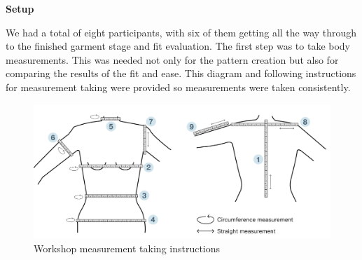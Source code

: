 \noindent \textbf{Setup}

We had a total of eight participants, with six of them getting all the way through to the finished garment stage and fit evaluation.
\newline
The first step was to take body measurements. This was needed not only for the pattern creation but also for comparing the results of the fit and ease. This diagram and following instructions for measurement taking were provided so measurements were taken consistently.
\begin{figure} [H] %
    \centering %
    \includegraphics[width = \textwidth]{Images/Measurement Taking Guide.png} %
    \caption{Workshop measurement taking instructions}
    \label{} %
\end{figure}

